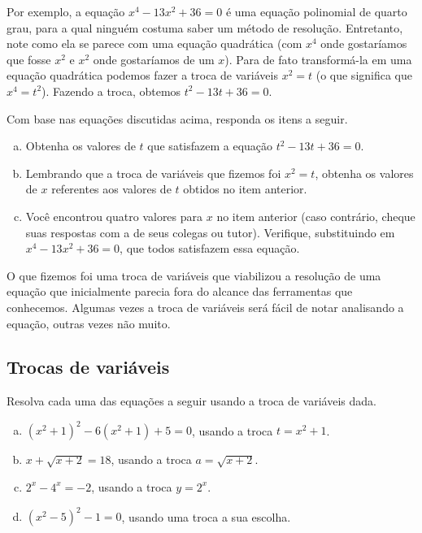 \documentclass[main_estudante.tex]{subfiles}
\begin{document}
Por exemplo, a equação $x^4-13x^2+36=0$ é uma equação polinomial de quarto grau, para a qual ninguém costuma saber um método de resolução. Entretanto, note como ela se parece com uma equação quadrática (com $x^4$ onde gostaríamos que fosse $x^2$ e $x^2$ onde gostaríamos de um $x$). Para de fato transformá-la em uma equação quadrática podemos fazer a troca de variáveis $x^2=t$ (o que significa que $x^4=t^2$). Fazendo a troca, obtemos $t^2-13t+36=0$.

\begin{questao}
Com base nas equações discutidas acima, responda os itens a seguir.
\begin{enumerate}[a)]
\item Obtenha os valores de $t$ que satisfazem a equação $t^2-13t+36=0$.
\item Lembrando que a troca de variáveis que fizemos foi $x^2=t$, obtenha os valores de $x$ referentes aos valores de $t$ obtidos no item anterior.
\item Você encontrou quatro valores para $x$ no item anterior (caso contrário, cheque suas respostas com a de seus colegas ou tutor). Verifique, substituindo em $x^4-13x^2+36=0$, que todos satisfazem essa equação.
\end{enumerate}
\end{questao}

O que fizemos foi uma troca de variáveis que viabilizou a resolução de uma equação que inicialmente parecia fora do alcance das ferramentas que conhecemos. Algumas vezes a troca de variáveis será fácil de notar analisando a equação, outras vezes não muito.

\subsection*{Trocas de variáveis}

\begin{questao}
Resolva cada uma das equações a seguir usando a troca de variáveis dada.
\begin{enumerate}[a)]
\item $(x^2+1)^2-6(x^2+1)+5=0$, usando a troca $t=x^2+1$.
\item $x+\sqrt{x+2}=18$, usando a troca $a=\sqrt{x+2}$.
\item $2^x-4^x=-2$, usando a troca $y=2^x$.
\item $(x^2-5)^2-1=0$, usando uma troca a sua escolha.
\end{enumerate}
\end{questao}
\end{document}
